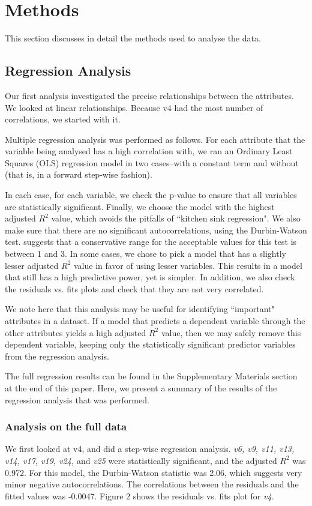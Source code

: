 \documentclass[12pt,a4paper,twocolumn]{article}
\begin{document}
	\section{Methods}
	This section discusses in detail the methods used to analyse the data.
	
	\subsection{Regression Analysis}
	Our first analysis investigated the precise relationships between the attributes. We looked at linear relationships. Because v4 had the most number of correlations, we started with it.
	
	Multiple regression analysis was performed as follows. For each attribute that the variable being analysed has a high correlation with, we ran an Ordinary Least Squares (OLS) regression model in two cases--with a constant term and without (that is, in a forward step-wise fashion). 
	
	In each case, for each variable, we check the p-value to ensure that all variables are statistically significant. Finally, we choose the model with the highest adjusted $R^2$ value, which avoids the pitfalls of ``kitchen sink regression". We also make sure that there are no significant autocorrelations, using the Durbin-Watson test. \cite{field2009discovering} suggests that a conservative range for the acceptable values for this test is between 1 and 3. In some cases, we chose to pick a model that has a slightly lesser adjusted $R^2$ value in favor of using lesser variables. This results in a model that still has a high predictive power, yet is simpler. In addition, we also check the residuals vs. fits plots and check that they are not very correlated. 
	
	We note here that this analysis may be useful for identifying ``important" attributes in a dataset. If a model that predicts a dependent variable through the other attributes yields a high adjusted $R^2$ value, then we may safely remove this dependent variable, keeping only the statistically significant predictor variables from the regression analysis.
	
	The full regression results can be found in the Supplementary Materials section at the end of this paper. Here, we present a summary of the results of the regression analysis that was performed.
	
	\subsubsection{Analysis on the full data}
	We first looked at v4, and did a step-wise regression analysis. \textit{v6, v9, v11, v13, v14, v17, v19, v24,} and \textit{v25} were statistically significant, and the adjusted $R^2$ was 0.972. For this model, the Durbin-Watson statistic was 2.06, which suggests very minor negative autocorrelations. The correlations between the residuals and the fitted values was -0.0047. Figure 2 shows the residuals vs. fits plot for \textit{v4}.\\
	
\end{document}
